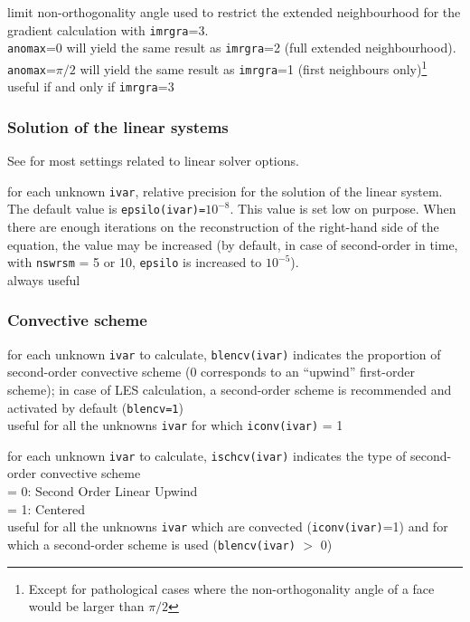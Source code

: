 {limit non-orthogonality angle used to restrict the extended neighbourhood for
the gradient calculation with {\tt imrgra}=3.\\
{\tt anomax}=0 will yield the same result as {\tt imrgra}=2 (full extended
neighbourhood). {\tt anomax}=$\pi/2$ will yield the same result as
{\tt imrgra}=1
(first neighbours only)\footnote{Except for pathological cases where the
non-orthogonality angle of a face would be larger than $\pi/2$}\\
useful if and only if {\tt imrgra}=3}

\subsubsection{Solution of the linear systems}

See 
for most settings related to linear solver options.

{for each unknown {\tt ivar}, relative precision for the solution of the linear
system. The default value is {\tt epsilo(ivar)=$10^{-8}$}. This value is set low
on purpose. When there are enough iterations on the reconstruction of the
right-hand side of the equation,
the value may be increased (by default, in case of second-order in time,
with {\tt nswrsm} = 5 or 10, {\tt epsilo} is increased to $10^{-5}$).\\
always useful}

\subsubsection{Convective scheme}

{for each unknown {\tt ivar} to calculate, {\tt blencv(ivar)} indicates the
 proportion of second-order convective scheme (0 corresponds to an
``upwind'' first-order scheme); in case of LES calculation, a
second-order scheme is recommended and activated by default ({\tt blencv=1})\\
useful for all the unknowns {\tt ivar} for which {\tt iconv(ivar)} = 1}

{for each unknown {\tt ivar} to calculate, {\tt ischcv(ivar)} indicates the type of second-order
convective scheme\\
\hspace*{1.3cm}= 0: Second Order Linear Upwind\\
\hspace*{1.3cm}= 1: Centered\\
useful for all the unknowns {\tt ivar} which are convected
({\tt iconv(ivar)}=1) and
for which a second-order scheme is used ({\tt blencv(ivar)} $>$ 0)}

